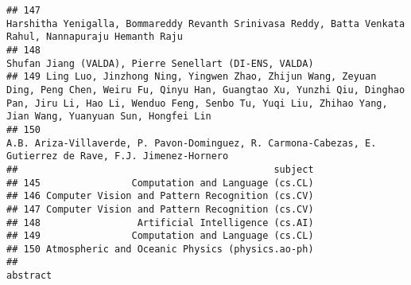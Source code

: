 \documentclass[
]{article}
\begin{document}
\begin{verbatim}
## 147                                                                                                                                     Harshitha Yenigalla, Bommareddy Revanth Srinivasa Reddy, Batta Venkata Rahul, Nannapuraju Hemanth Raju
## 148                                                                                                                                                                                     Shufan Jiang (VALDA), Pierre Senellart (DI-ENS, VALDA)
## 149 Ling Luo, Jinzhong Ning, Yingwen Zhao, Zhijun Wang, Zeyuan Ding, Peng Chen, Weiru Fu, Qinyu Han, Guangtao Xu, Yunzhi Qiu, Dinghao Pan, Jiru Li, Hao Li, Wenduo Feng, Senbo Tu, Yuqi Liu, Zhihao Yang, Jian Wang, Yuanyuan Sun, Hongfei Lin
## 150                                                                                                                                  A.B. Ariza-Villaverde, P. Pavon-Dominguez, R. Carmona-Cabezas, E. Gutierrez de Rave, F.J. Jimenez-Hornero
##                                             subject
## 145                Computation and Language (cs.CL)
## 146 Computer Vision and Pattern Recognition (cs.CV)
## 147 Computer Vision and Pattern Recognition (cs.CV)
## 148                 Artificial Intelligence (cs.AI)
## 149                Computation and Language (cs.CL)
## 150 Atmospheric and Oceanic Physics (physics.ao-ph)
##                                                                                                                                                                                                                                                                                                                                                                                                                                                                                                                                                                                                                                                                                                                                                                                                                                                                                                                                                                                                                                                                                                                                                                                                                                                                                                                                                                                                                                                                                                                                                                                                                                                                                                                                                                                                                                                                                                                                                               abstract

\end{verbatim}
\end{document}
